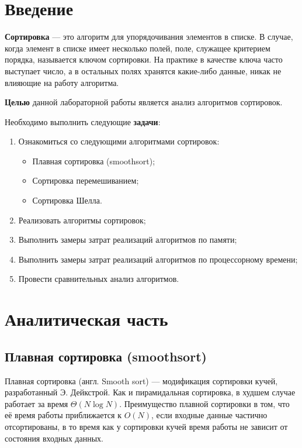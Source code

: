\chapter*{Введение}

\textbf{Сортировка} — это алгоритм для упорядочивания элементов в списке. В случае, когда элемент в списке имеет несколько полей, поле, служащее критерием порядка, называется ключом сортировки. На практике в качестве ключа часто выступает число, а в остальных полях хранятся какие-либо данные, никак не влияющие на работу алгоритма.

\textbf{Целью} данной лабораторной работы является анализ алгоритмов сортировок.

Необходимо выполнить следующие \textbf{задачи}:
\begin{enumerate}
    \item Ознакомиться со следующими алгоритмами сортировок:
    \begin{itemize}    
        \item Плавная сортировка (smoothsort);
        \item Сортировка перемешиванием;
        \item Сортировка Шелла.
    \end{itemize}
    \item Реализовать алгоритмы сортировок;
    \item Выполнить замеры затрат реализаций алгоритмов по памяти;
    \item Выполнить замеры затрат реализаций алгоритмов по процессорному времени;
    \item Провести сравнительных анализ алгоритмов.
\end{enumerate}

\chapter{Аналитическая часть}

\section{Плавная сортировка (smoothsort)}
Плавная сортировка (англ. Smooth sort) — модификация сортировки кучей, разработанный Э. Дейкстрой. Как и пирамидальная сортировка, в худшем случае работает за время $\Theta(N\log{N})$. Преимущество плавной сортировки в том, что её время работы приближается к $O(N)$, если входные данные частично отсортированы, в то время как у сортировки кучей время работы не зависит от состояния входных данных.
